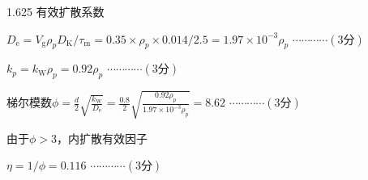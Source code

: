 \documentclass[12pt, b5paper]{article}
\begin{document}
\begin{spacing}{1.625}
有效扩散系数

$D_\mathrm{e} = V_\mathrm{g}\rho_p D_\mathrm{K}/\tau_\mathrm{m} = 0.35\times \rho_p \times 0.014/2.5 = 1.97\times 10^{-3}\rho_p$ \hfill  $\cdots \cdots \cdots \cdots (3\text{分})$ 

$k_p = k_\mathrm{W}\rho_p = 0.92\rho_p$ \hfill  $\cdots \cdots \cdots \cdots (3\text{分})$ 

梯尔模数$\phi = \frac{d}{2}\sqrt{\frac{k_\mathrm{W}}{D_\mathrm{e}}} = \frac{0.8}{2}\sqrt{\frac{0.92\rho_p}{1.97\times 10^{-3}\rho_p}} = 8.62$ \hfill $\cdots \cdots \cdots \cdots (3\text{分})$ 

由于$\phi > 3$，内扩散有效因子

$\eta = 1/\phi = 0.116$ \hfill $\cdots \cdots \cdots \cdots (3\text{分})$ 

\end{spacing}
\end{document}
